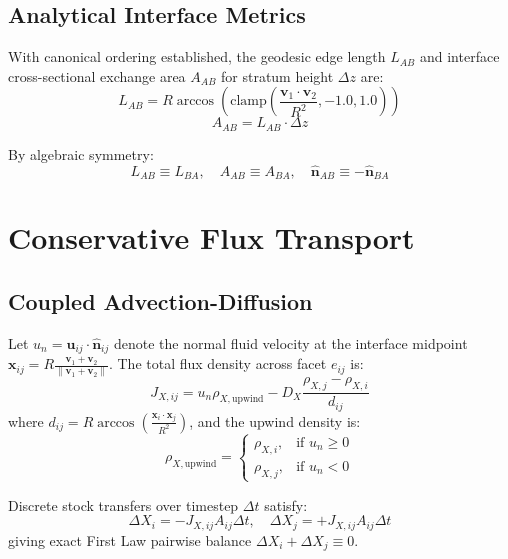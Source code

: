\documentclass[twocolumn,10pt,amsmath,amssymb,aps,prl]{revtex4-2}
\begin{document}
\subsection{Analytical Interface Metrics}
With canonical ordering established, the geodesic edge length $L_{AB}$ and interface cross-sectional exchange area $A_{AB}$ for stratum height $\Delta z$ are:
\begin{equation}
L_{AB} = R \arccos\left(\mathrm{clamp}\left(\frac{\mathbf{v}_1 \cdot \mathbf{v}_2}{R^2}, -1.0, 1.0\right)\right)
\end{equation}
\begin{equation}
A_{AB} = L_{AB} \cdot \Delta z
\end{equation}

By algebraic symmetry:
\begin{equation}
L_{AB} \equiv L_{BA}, \quad A_{AB} \equiv A_{BA}, \quad \hat{\mathbf{n}}_{AB} \equiv -\hat{\mathbf{n}}_{BA}
\end{equation}

\section{Conservative Flux Transport}

\subsection{Coupled Advection-Diffusion}
Let $u_n = \mathbf{u}_{ij} \cdot \hat{\mathbf{n}}_{ij}$ denote the normal fluid velocity at the interface midpoint $\mathbf{x}_{ij} = R \frac{\mathbf{v}_1 + \mathbf{v}_2}{\|\mathbf{v}_1 + \mathbf{v}_2\|}$. The total flux density across facet $e_{ij}$ is:
\begin{equation}
J_{X, ij} = u_n \rho_{X, \text{upwind}} - D_X \frac{\rho_{X, j} - \rho_{X, i}}{d_{ij}}
\end{equation}
where $d_{ij} = R \arccos\left(\frac{\mathbf{x}_i \cdot \mathbf{x}_j}{R^2}\right)$, and the upwind density is:
\begin{equation}
\rho_{X, \text{upwind}} = \begin{cases}
\rho_{X, i}, & \text{if } u_n \ge 0 \\
\rho_{X, j}, & \text{if } u_n < 0
\end{cases}
\end{equation}

Discrete stock transfers over timestep $\Delta t$ satisfy:
\begin{equation}
\Delta X_i = - J_{X, ij} A_{ij} \Delta t, \quad \Delta X_j = + J_{X, ij} A_{ij} \Delta t
\end{equation}
giving exact First Law pairwise balance $\Delta X_i + \Delta X_j \equiv 0$.
\end{document}
